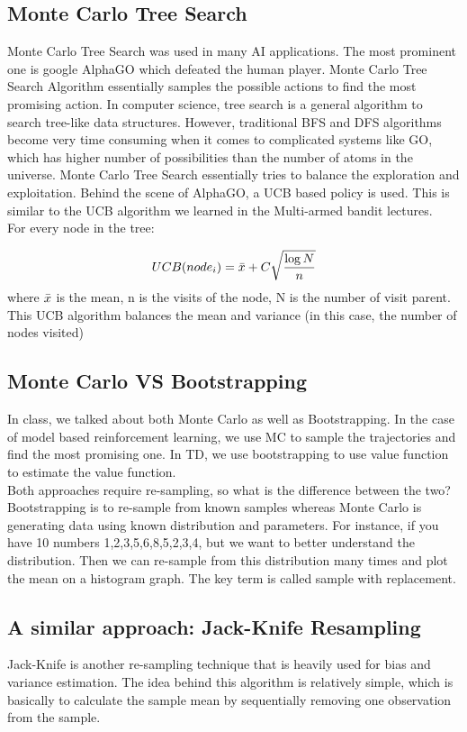 \documentclass[11pt]{article}
\begin{document}
\subsection{Monte Carlo Tree Search}
Monte Carlo Tree Search was used in many AI applications. The most prominent one is google AlphaGO which defeated the human player. Monte Carlo Tree Search Algorithm essentially samples the possible actions to find the most promising action. In computer science, tree search is a general algorithm to search tree-like data structures. However, traditional BFS and DFS algorithms become very time consuming when it comes to complicated systems like GO, which has higher number of possibilities than the number of atoms in the universe. Monte Carlo Tree Search essentially tries to balance the exploration and exploitation. Behind the scene of AlphaGO, a UCB based policy is used. This is similar to the UCB algorithm we learned in the Multi-armed bandit lectures. \\
For every node in the tree:

\begin{equation}
UCB(node_i) = \Bar{x} +C\sqrt{\dfrac{\log{N}}{n}}
\end{equation}
where $\Bar{x}$ is the mean, n is the visits of the node, N is the number of visit parent. This UCB algorithm balances the mean and variance (in this case, the number of nodes visited)

\subsection{Monte Carlo VS Bootstrapping}
In class, we talked about both Monte Carlo as well as Bootstrapping. In the case of model based reinforcement learning, we use MC to sample the trajectories and find the most promising one. In TD, we use bootstrapping to use value function to estimate the value function.\\
Both approaches require re-sampling, so what is the difference between the two? \\
Bootstrapping is to re-sample from known samples whereas Monte Carlo is generating data using known distribution and parameters. For instance, if you have 10 numbers {1,2,3,5,6,8,5,2,3,4}, but we want to better understand the distribution. Then we can re-sample from this distribution many times and plot the mean on a histogram graph. The key term is called sample with replacement. 

\subsection{A similar approach: Jack-Knife Resampling}
Jack-Knife is another re-sampling technique that is heavily used for bias and variance estimation. The idea behind this algorithm is relatively simple, which is basically to calculate the sample mean by sequentially removing one observation from the sample. 
\end{document}

